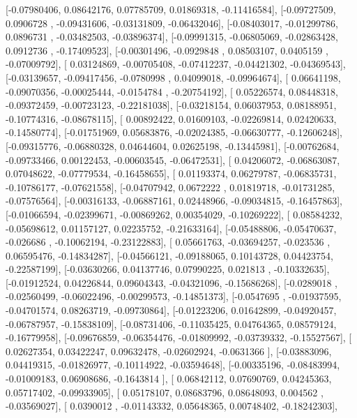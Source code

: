 \documentclass{article}
\begin{document}
       [-0.07980406,  0.08642176,  0.07785709,  0.01869318, -0.11416584],
       [-0.09727509,  0.0906728 , -0.09431606, -0.03131809, -0.06432046],
       [-0.08403017, -0.01299786,  0.0896731 , -0.03482503, -0.03896374],
       [-0.09991315, -0.06805069, -0.02863428,  0.0912736 , -0.17409523],
       [-0.00301496, -0.0929848 ,  0.08503107,  0.0405159 , -0.07009792],
       [ 0.03124869, -0.00705408, -0.07412237, -0.04421302, -0.04369543],
       [-0.03139657, -0.09417456, -0.0780998 ,  0.04099018, -0.09964674],
       [ 0.06641198, -0.09070356, -0.00025444, -0.0154784 , -0.20754192],
       [ 0.05226574,  0.08448318, -0.09372459, -0.00723123, -0.22181038],
       [-0.03218154,  0.06037953,  0.08188951, -0.10774316, -0.08678115],
       [ 0.00892422,  0.01609103, -0.02269814,  0.02420633, -0.14580774],
       [-0.01751969,  0.05683876, -0.02024385, -0.06630777, -0.12606248],
       [-0.09315776, -0.06880328,  0.04644604,  0.02625198, -0.13445981],
       [-0.00762684, -0.09733466,  0.00122453, -0.00603545, -0.06472531],
       [ 0.04206072, -0.06863087,  0.07048622, -0.07779534, -0.16458655],
       [ 0.01193374,  0.06279787, -0.06835731, -0.10786177, -0.07621558],
       [-0.04707942,  0.0672222 ,  0.01819718, -0.01731285, -0.07576564],
       [-0.00316133, -0.06887161,  0.02448966, -0.09034815, -0.16457863],
       [-0.01066594, -0.02399671, -0.00869262,  0.00354029, -0.10269222],
       [ 0.08584232, -0.05698612,  0.01157127,  0.02235752, -0.21633164],
       [-0.05488806, -0.05470637, -0.026686  , -0.10062194, -0.23122883],
       [ 0.05661763, -0.03694257, -0.023536  ,  0.06595476, -0.14834287],
       [-0.04566121, -0.09188065,  0.10143728,  0.04423754, -0.22587199],
       [-0.03630266,  0.04137746,  0.07990225,  0.021813  , -0.10332635],
       [-0.01912524,  0.04226844,  0.09604343, -0.04321096, -0.15686268],
       [-0.0289018 , -0.02560499, -0.06022496, -0.00299573, -0.14851373],
       [-0.0547695 , -0.01937595, -0.04701574,  0.08263719, -0.09730864],
       [-0.01223206,  0.01642899, -0.04920457, -0.06787957, -0.15838109],
       [-0.08731406, -0.11035425,  0.04764365,  0.08579124, -0.16779958],
       [-0.09676859, -0.06354476, -0.01809992, -0.03739332, -0.15527567],
       [ 0.02627354,  0.03422247,  0.09632478, -0.02602924, -0.0631366 ],
       [-0.03883096,  0.04419315, -0.01826977, -0.10114922, -0.03594648],
       [-0.00335196, -0.08483994, -0.01009183,  0.06908686, -0.1643814 ],
       [ 0.06842112,  0.07690769,  0.04245363,  0.05717402, -0.09933905],
       [ 0.05178107,  0.08683796,  0.08648093,  0.004562  , -0.03569027],
       [ 0.0390012 , -0.01143332,  0.05648365,  0.00748402, -0.18242303],
\end{document}
